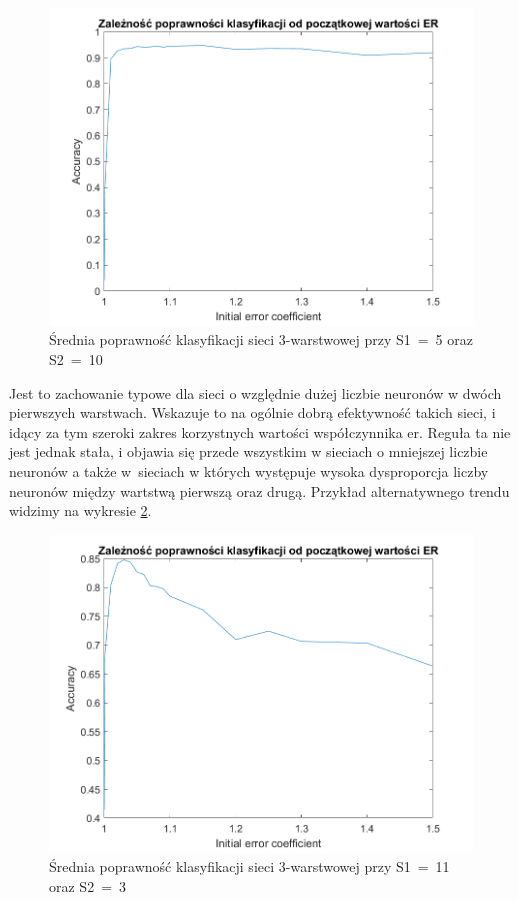 \documentclass[12pt,twoside]{article}
\begin{document}
\begin{figure}[ht]
	\centering
	\includegraphics[width=16cm]{figures/Er_2.png}
	\caption{Średnia poprawność klasyfikacji sieci 3-warstwowej przy S1~=~5 oraz S2~=~10}
	\label{Fig:Er2}
\end{figure}

Jest to zachowanie typowe dla sieci o względnie dużej liczbie neuronów w dwóch pierwszych warstwach.
Wskazuje to na ogólnie dobrą efektywność takich sieci, i idący za tym szeroki zakres korzystnych wartości współczynnika er.
Reguła ta nie jest jednak stała, i objawia się przede wszystkim w sieciach o mniejszej liczbie neuronów a także w~sieciach w których występuje wysoka dysproporcja liczby neuronów między wartstwą pierwszą oraz drugą.
Przykład alternatywnego trendu widzimy na wykresie \ref{Fig:Er3}.

\begin{figure}[ht]
	\centering
	\includegraphics[width=16cm]{figures/Er_3.png}
	\caption{Średnia poprawność klasyfikacji sieci 3-warstwowej przy S1~=~11 oraz S2~=~3}
	\label{Fig:Er3}
\end{figure}
\end{document}
